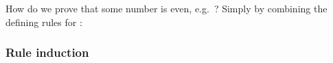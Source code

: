 \begin{isabellebody}
\begin{isamarkuptext}
How do we prove that some number is even, e.g.\ ? Simply by combining the defining rules for :
\begin{quote}
\end{quote}

\subsubsection{Rule induction}


\end{isamarkuptext}
\end{isabellebody}
